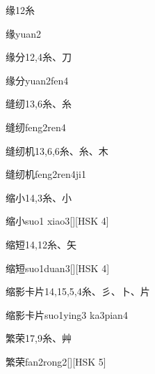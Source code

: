 \begin{entry}{缘}{12}{⽷}
  \begin{phonetics}{缘}{yuan2}
  \end{phonetics}
\end{entry}

\begin{entry}{缘分}{12,4}{⽷、⼑}
  \begin{phonetics}{缘分}{yuan2fen4}
  \end{phonetics}
\end{entry}

\begin{entry}{缝纫}{13,6}{⽷、⽷}
  \begin{phonetics}{缝纫}{feng2ren4}
  \end{phonetics}
\end{entry}

\begin{entry}{缝纫机}{13,6,6}{⽷、⽷、⽊}
  \begin{phonetics}{缝纫机}{feng2ren4ji1}
  \end{phonetics}
\end{entry}

\begin{entry}{缩小}{14,3}{⽷、⼩}
  \begin{phonetics}{缩小}{suo1 xiao3}[][HSK 4]
  \end{phonetics}
\end{entry}

\begin{entry}{缩短}{14,12}{⽷、⽮}
  \begin{phonetics}{缩短}{suo1duan3}[][HSK 4]
  \end{phonetics}
\end{entry}

\begin{entry}{缩影卡片}{14,15,5,4}{⽷、⼺、⼘、⽚}
  \begin{phonetics}{缩影卡片}{suo1ying3 ka3pian4}
  \end{phonetics}
\end{entry}

\begin{entry}{繁荣}{17,9}{⽷、⾋}
  \begin{phonetics}{繁荣}{fan2rong2}[][HSK 5]
  \end{phonetics}
\end{entry}


